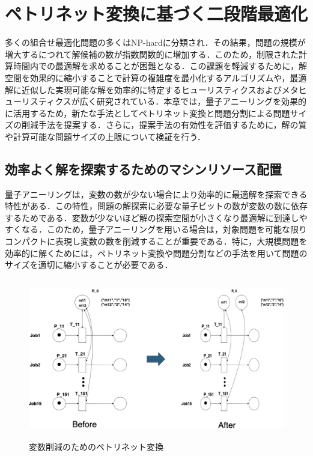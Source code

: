 \chapter{ペトリネット変換に基づく二段階最適化}
\label{main_survey}

多くの組合せ最適化問題の多くはNP-hardに分類され．その結果，問題の規模が増大するにつれて解候補の数が指数関数的に増加する．このため，制限された計算時間内での最適解を求めることが困難となる．この課題を軽減するために，解空間を効果的に縮小することで計算の複雑度を最小化するアルゴリズムや，最適解に近似した実現可能な解を効率的に特定するヒューリスティクスおよびメタヒューリスティクスが広く研究されている．本章では，量子アニーリングを効果的に活用するため，新たな手法としてペトリネット変換と問題分割による問題サイズの削減手法を提案する．さらに，提案手法の有効性を評価するために，解の質や計算可能な問題サイズの上限について検証を行う．

\section{効率よく解を探索するためのマシンリソース配置}
量子アニーリングは，変数の数が少ない場合により効率的に最適解を探索できる特性がある．この特性，問題の解探索に必要な量子ビットの数が変数の数に依存するためである．変数が少ないほど解の探索空間が小さくなり最適解に到達しやすくなる．このため，量子アニーリングを用いる場合は，対象問題を可能な限りコンパクトに表現し変数の数を削減することが重要である．特に，大規模問題を効率的に解くためには，ペトリネット変換や問題分割などの手法を用いて問題のサイズを適切に縮小することが必要である．

\begin{figure}[H]
    \centering
    \includegraphics[width=0.8\linewidth, height=7cm]{./images/transformation.png}
    \caption{変数削減のためのペトリネット変換}
    \label{fig:fig5}
\end{figure}

